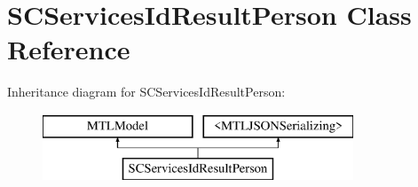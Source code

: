 \hypertarget{interface_s_c_services_id_result_person}{}\section{S\+C\+Services\+Id\+Result\+Person Class Reference}
\label{interface_s_c_services_id_result_person}
Inheritance diagram for S\+C\+Services\+Id\+Result\+Person\+:\begin{figure}[H]
\begin{center}
\leavevmode
\includegraphics[height=2.000000cm]{interface_s_c_services_id_result_person}
\end{center}
\end{figure}
